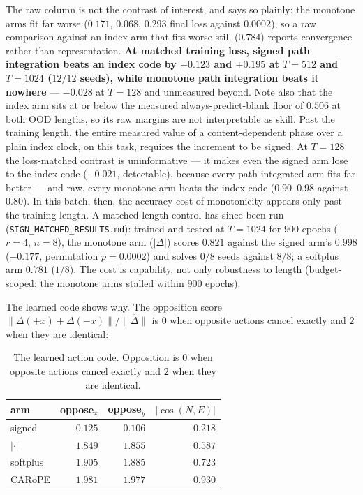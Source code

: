 \documentclass[11pt]{article}
\begin{document}
\noindent The raw column is not the contrast of interest, and says so plainly: the
monotone arms fit far worse ($0.171$, $0.068$, $0.293$ final loss against $0.0002$),
so a raw comparison against an index arm that fits worse still ($0.784$) reports
convergence rather than representation. \textbf{At matched training loss, signed path
integration beats an index code by $+0.123$ and $+0.195$ at $T=512$ and $T=1024$
($12/12$ seeds), while monotone path integration beats it nowhere} --- $-0.028$ at
$T=128$ and unmeasured beyond. Note also that the index arm sits at or below the
measured always-predict-blank floor of $0.506$ at both OOD lengths, so its raw
margins are not interpretable as skill. Past the training length, the entire measured
value of a content-dependent phase over a plain index clock, on this task, requires
the increment to be signed. At $T=128$ the loss-matched contrast is uninformative ---
it makes even the signed arm lose to the index code ($-0.021$, detectable), because
every path-integrated arm fits far better --- and raw, every monotone arm beats the
index code ($0.90$--$0.98$ against $0.80$). In this batch, then, the accuracy cost of
monotonicity appears only past the training length. A matched-length control has since
been run (\texttt{SIGN\_MATCHED\_RESULTS.md}): trained and tested at $T=1024$ for $900$
epochs ($r=4$, $n=8$), the monotone arm ($|\Delta|$) scores $0.821$ against the signed
arm's $0.998$ ($-0.177$, permutation $p=0.0002$) and solves $0/8$ seeds against $8/8$;
a softplus arm $0.781$ ($1/8$). The cost is capability, not only robustness to length
(budget-scoped: the monotone arms stalled within $900$ epochs).

The learned code shows why. The opposition score
$\lVert\Delta(+x)+\Delta(-x)\rVert / \overline{\lVert\Delta\rVert}$ is $0$ when
opposite actions cancel exactly and $2$ when they are identical:

\begin{table}[htbp]\centering\small
\caption{The learned action code. Opposition is $0$ when opposite actions cancel exactly and $2$ when they are identical.}
\label{tab:opposition}
\begin{tabular}{lrrr}
\toprule
arm & oppose$_x$ & oppose$_y$ & $|\cos(N,E)|$ \\
\midrule
signed    & $\mathbf{0.125}$ & $\mathbf{0.106}$ & $0.218$ \\
$|\cdot|$ & $1.849$ & $1.855$ & $0.587$ \\
softplus  & $1.905$ & $1.885$ & $0.723$ \\
CARoPE    & $\mathbf{1.981}$ & $\mathbf{1.977}$ & $\mathbf{0.930}$ \\
\bottomrule
\end{tabular}
\end{table}
\end{document}
